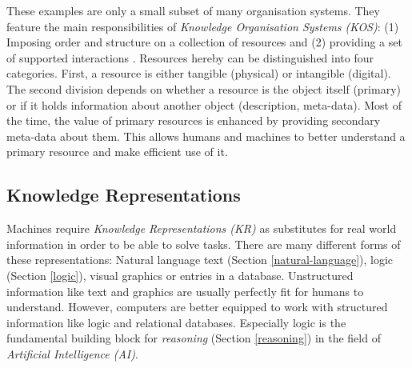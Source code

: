 These examples are only a small subset of many organisation systems. They feature the main responsibilities of \textit{Knowledge Organisation Systems (KOS)}: (1) Imposing order and structure on a collection of resources and (2) providing a set of supported interactions \cite{Glushko2013a}.
Resources hereby can be distinguished into four categories.
First, a resource is either tangible (physical) or intangible (digital).
The second division depends on whether a resource is the object itself (primary) or if it holds information about another object (description, meta-data).
Most of the time, the value of primary resources is enhanced by providing secondary meta-data about them.
This allows humans and machines to better understand a primary resource and make efficient use of it.


\subsection{Knowledge Representations} \label{knowledge-representations}
Machines require \textit{Knowledge Representations (KR)} as substitutes for real world information in order to be able to solve tasks.
There are many different forms of these representations: Natural language text (Section \ref{natural-language}), logic (Section \ref{logic}), visual graphics or entries in a database.
Unstructured information like text and graphics are usually perfectly fit for humans to understand.
However, computers are better equipped to work with structured information like logic and relational databases.
Especially logic is the fundamental building block for \textit{reasoning} (Section \ref{reasoning}) in the field of \textit{Artificial Intelligence (AI)}.

